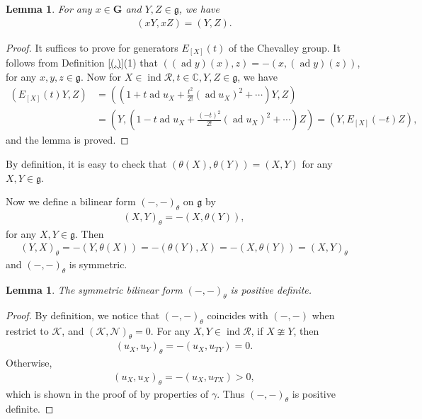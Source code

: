 \documentclass[12pt]{amsart}
\newtheorem{lemma}[theorem]{Lemma}
\begin{document}
\begin{lemma}
    For any $x\in \mathbf{G}$ and $Y,Z\in \mathfrak{g}$, we have 
    \begin{align*}
        (xY,xZ)=(Y,Z).
    \end{align*}
\end{lemma}

\begin{proof}
    It suffices to prove for generators $E_{[X]}(t)$ of the Chevalley group.
    It follows from Definition \ref{(,)}(1) that $((\operatorname{ad}y)(x),z)=-(x,(\operatorname{ad}y)(z))$, for any $x,y,z\in \mathfrak{g}$.
    Now for $X\in \operatorname{ind}\mathcal{R},t\in \mathbb{C},Y,Z\in \mathfrak{g}$, we have 
    \begin{align*}
        (E_{[X]}(t)Y,Z)&=((1+t\operatorname{ad}u_X+\frac{t^2}{2!}(\operatorname{ad}u_X)^2+\cdots)Y,Z)\\
       & =(Y,(1-t\operatorname{ad}u_X+\frac{(-t)^2}{2!}(\operatorname{ad}u_X)^2+\cdots)Z)=(Y,E_{[X]}(-t)Z),
    \end{align*}
    and the lemma is proved.
\end{proof}

By definition, it is easy to check that $(\theta (X),\theta (Y))=(X,Y)$ for any $X,Y\in \mathfrak{g}$.

Now we define a bilinear form $(-,-)_{\theta}$ on $\mathfrak{g}$ by 
\begin{align*}
    (X,Y)_{\theta}=-(X,\theta (Y)),
\end{align*}
for any $X,Y\in \mathfrak{g}$.
Then 
\begin{align*}
    (Y,X)_{\theta}=-(Y,\theta(X))=-(\theta(Y),X)=-(X,\theta (Y))=(X,Y)_{\theta}
\end{align*}
and $(-,-)_{\theta}$ is symmetric.

\begin{lemma}
    The symmetric bilinear form $(-,-)_{\theta}$ is positive definite.
\end{lemma}

\begin{proof}
    By definition, we notice that $(-,-)_{\theta}$ coincides with $(-,-)$ when restrict to $\mathcal{K}$, and $(\mathcal{K},\mathcal{N})_{\theta}=0$.
    For any $X,Y\in \operatorname{ind}\mathcal{R}$, if $X\ncong Y$, then 
    \begin{align*}
        (u_X,u_Y)_{\theta}=-(u_X,u_{TY})=0.
    \end{align*}
    Otherwise,
    \begin{align*}
        (u_X,u_X)_{\theta}=-(u_X,u_{TX})>0,
    \end{align*}
    which is shown in the proof of \cite[Proposition 30]{notes2} by properties of $\gamma$.
    Thus $(-,-)_{\theta}$ is positive definite.
\end{proof}
\end{document}
